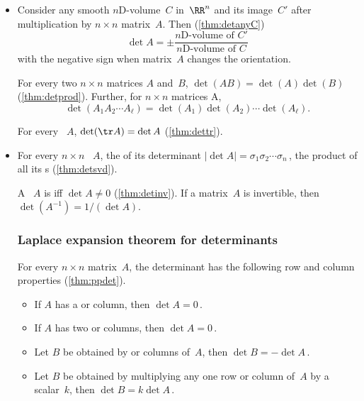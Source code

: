 \begin{itemize}
\item Consider any  smooth $n$D-volume~\(C\) in~\(\RR^n\) and its image~\(C'\) after multiplication by \(n\times n\) matrix~\(A\).
Then (\autoref{thm:detanyC})
\begin{equation*}
\det A=\pm\frac{\text{$n$D-volume of }C'}
{\text{$n$D-volume of }C}
\end{equation*}
with the negative sign when matrix~\(A\) changes the orientation.

\itemhi For every two \(n\times n\) matrices \(A\) and~\(B\), \(\det(AB)=\det(A)\det(B)\) (\autoref{thm:detprod}).
Further, for \(n\times n\) matrices \hlist A\ell, \begin{equation*}
\det(A_1A_2\cdots A_\ell)=\det(A_1)\det(A_2)\cdots\det(A_\ell).
\end{equation*}


\itemme For every ~\(A\), \(\det(\tr A)=\det A\) (\autoref{thm:dettr}).

\item For every \(n\times n\) ~\(A\), the  of its determinant \(|\det A|=\sigma_1\sigma_2\cdots\sigma_n\)\,, the product of all its s (\autoref{thm:detsvd}).

\itemme A ~\(A\) is  iff \(\det A\neq 0\) (\autoref{thm:detinv}).
If a matrix~\(A\) is invertible, then \(\det(A^{-1})=1/(\det A)\).







\subsubsection*{Laplace expansion theorem for determinants}

\itemhi For every \(n\times n\) matrix~\(A\), the determinant has the following row and column properties (\autoref{thm:ppdet}).
\begin{itemize}
\item
If \(A\) has a  or column, then \(\det A=0\)\,.
\item
If \(A\) has two  or columns, then  \(\det A=0\)\,.
\item
Let \(B\) be obtained by  or columns of~\(A\), then \(\det B=-\det A\)\,.
\item
Let \(B\) be obtained by multiplying any one row or column of~\(A\) by a scalar~\(k\), then \(\det B=k\det A\)\,.
\end{itemize}


\end{itemize}
